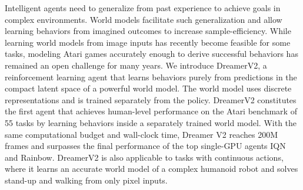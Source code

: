 Intelligent agents need to generalize from past experience to achieve goals in complex environments. World models facilitate such generalization and allow learning behaviors from imagined outcomes to increase sample-efficiency. While learning world models from image inputs has recently become feasible for some tasks, modeling Atari games accurately enough to derive successful behaviors has remained an open challenge for many years. We introduce DreamerV2, a reinforcement learning agent that learns behaviors purely from predictions in the compact latent space of a powerful world model. The world model uses discrete representations and is trained separately from the policy. DreamerV2 constitutes the first agent that achieves human-level performance on the Atari benchmark of 55 tasks by learning behaviors inside a separately trained world model. With the same computational budget and wall-clock time, Dreamer V2 reaches 200M frames and surpasses the final performance of the top single-GPU agents IQN and Rainbow. DreamerV2 is also applicable to tasks with continuous actions, where it learns an accurate world model of a complex humanoid robot and solves stand-up and walking from only pixel inputs.